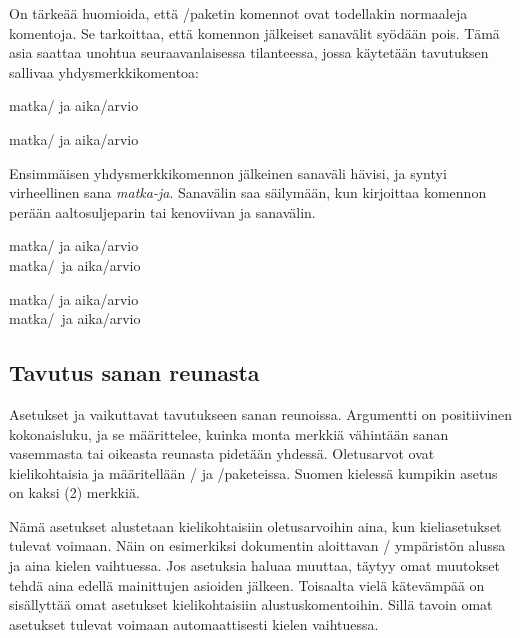 On tärkeää huomioida, että \-/paketin komennot ovat
todellakin normaaleja komentoja. Se tarkoittaa, että komennon jälkeiset
sanavälit syödään pois. Tämä asia saattaa unohtua seuraavanlaisessa
tilanteessa, jossa käytetään tavutuksen sallivaa yhdysmerkkikomentoa:

\komentoi{-/}
\begin{koodilohkosis}
matka\-/ ja aika\-/arvio
\end{koodilohkosis}

\begin{tulossis}
  matka\-/ ja aika\-/arvio
\end{tulossis}

\noindent
Ensimmäisen yhdysmerkkikomennon jälkeinen sanaväli hävisi, ja syntyi
virheellinen sana \emph{matka-ja}. Sanavälin saa säilymään, kun
kirjoittaa komennon perään aaltosuljeparin tai kenoviivan ja sanavälin.

\komentoi{-/}
\begin{koodilohkosis}
matka\-/{} ja aika\-/arvio \\
matka\-/\ ja aika\-/arvio
\end{koodilohkosis}

\begin{tulossis}
  matka\-/{} ja aika\-/arvio \\
  matka\-/\ ja aika\-/arvio
\end{tulossis}

\subsection{Tavutus sanan reunasta}

Asetukset  ja
 vaikuttavat tavutukseen sanan
reunoissa. Argumentti  on positiivinen kokonaisluku, ja se
määrittelee, kuinka monta merkkiä vähintään sanan vasemmasta tai
oikeasta reunasta pidetään yhdessä. Oletusarvot ovat kielikohtaisia ja
määritellään \-/{} ja \-/paketeissa.
Suomen kielessä kumpikin asetus on kaksi (2) merkkiä.

Nämä asetukset alustetaan kielikohtaisiin oletusarvoihin aina, kun
kieliasetukset tulevat voimaan. Näin on esimerkiksi dokumentin
aloittavan \-/ ympäristön alussa ja aina kielen
vaihtuessa. Jos asetuksia haluaa muuttaa, täytyy omat muutokset tehdä
aina edellä mainittujen asioiden jälkeen. Toisaalta vielä kätevämpää on
sisällyttää omat asetukset kielikohtaisiin alustuskomentoihin. Sillä
tavoin omat asetukset tulevat voimaan automaattisesti kielen vaihtuessa.

